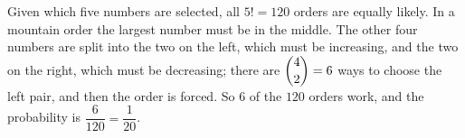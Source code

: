 Given which five numbers are selected, all $5!=120$ orders are equally likely. In a mountain order the largest number must be in the middle. The other four numbers are split into the two on the left, which must be increasing, and the two on the right, which must be decreasing; there are $\dbinom42=6$ ways to choose the left pair, and then the order is forced. So $6$ of the $120$ orders work, and the probability is $\dfrac{6}{120}=\boxed{\dfrac1{20}}$.
